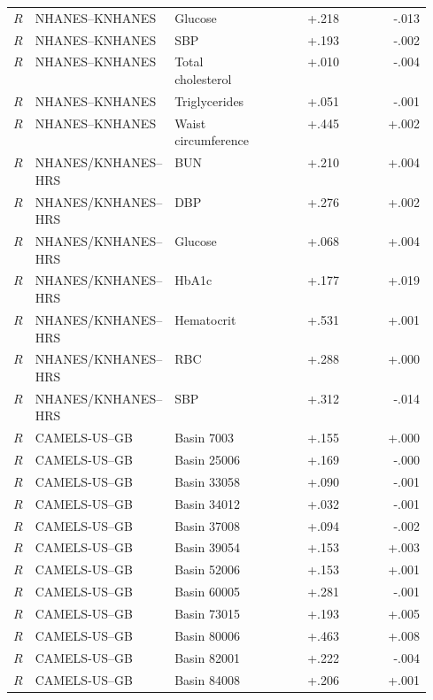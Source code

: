 \begin{longtable}{P{0.045\linewidth}P{0.27\linewidth}P{0.23\linewidth}rr}
$R$ & NHANES--KNHANES & Glucose & +.218 & -.013 \\
$R$ & NHANES--KNHANES & SBP & +.193 & -.002 \\
$R$ & NHANES--KNHANES & Total cholesterol & +.010 & -.004 \\
$R$ & NHANES--KNHANES & Triglycerides & +.051 & -.001 \\
$R$ & NHANES--KNHANES & Waist circumference & +.445 & +.002 \\
\addlinespace[1pt]
$R$ & NHANES/KNHANES--HRS & BUN & +.210 & +.004 \\
$R$ & NHANES/KNHANES--HRS & DBP & +.276 & +.002 \\
$R$ & NHANES/KNHANES--HRS & Glucose & +.068 & +.004 \\
$R$ & NHANES/KNHANES--HRS & HbA1c & +.177 & +.019 \\
$R$ & NHANES/KNHANES--HRS & Hematocrit & +.531 & +.001 \\
$R$ & NHANES/KNHANES--HRS & RBC & +.288 & +.000 \\
$R$ & NHANES/KNHANES--HRS & SBP & +.312 & -.014 \\
\addlinespace[1pt]
$R$ & CAMELS-US--GB & Basin 7003 & +.155 & +.000 \\
$R$ & CAMELS-US--GB & Basin 25006 & +.169 & -.000 \\
$R$ & CAMELS-US--GB & Basin 33058 & +.090 & -.001 \\
$R$ & CAMELS-US--GB & Basin 34012 & +.032 & -.001 \\
$R$ & CAMELS-US--GB & Basin 37008 & +.094 & -.002 \\
$R$ & CAMELS-US--GB & Basin 39054 & +.153 & +.003 \\
$R$ & CAMELS-US--GB & Basin 52006 & +.153 & +.001 \\
$R$ & CAMELS-US--GB & Basin 60005 & +.281 & -.001 \\
$R$ & CAMELS-US--GB & Basin 73015 & +.193 & +.005 \\
$R$ & CAMELS-US--GB & Basin 80006 & +.463 & +.008 \\
$R$ & CAMELS-US--GB & Basin 82001 & +.222 & -.004 \\
$R$ & CAMELS-US--GB & Basin 84008 & +.206 & +.001 \\
\end{longtable}

